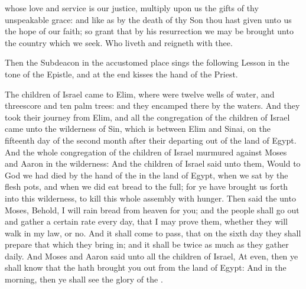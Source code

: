 {} whose love and service is our justice, multiply upon us the gifts of thy unspeakable grace: and like as by the death of thy Son thou hast given unto us the hope of our faith; so grant that by his resurrection we may be brought unto the country which we seek. Who liveth and reigneth with thee.

\begin{rubric}
    Then the Subdeacon in the accustomed place sings the following Lesson in the tone of the Epistle, and at the end kisses the hand of the Priest.
\end{rubric}

\vspace{-0.25\baselineskip}


\vspace{-0.1\baselineskip}

 The children of Israel came to Elim, where were twelve wells of water, and threescore and ten palm trees: and they encamped there by the waters. And they took their journey from Elim, and all the congregation of the children of Israel came unto the wilderness of Sin, which is between Elim and Sinai, on the fifteenth day of the second month after their departing out of the land of Egypt. And the whole congregation of the children of Israel murmured against Moses and Aaron in the wilderness: And the children of Israel said unto them, Would to God we had died by the hand of the  in the land of Egypt, when we sat by the flesh pots, and when we did eat bread to the full; for ye have brought us forth into this wilderness, to kill this whole assembly with hunger. Then said the  unto Moses, Behold, I will rain bread from heaven for you; and the people shall go out and gather a certain rate every day, that I may prove them, whether they will walk in my law, or no. And it shall come to pass, that on the sixth day they shall prepare that which they bring in; and it shall be twice as much as they gather daily. And Moses and Aaron said unto all the children of Israel, At even, then ye shall know that the  hath brought you out from the land of Egypt: And in the morning, then ye shall see the glory of the .


